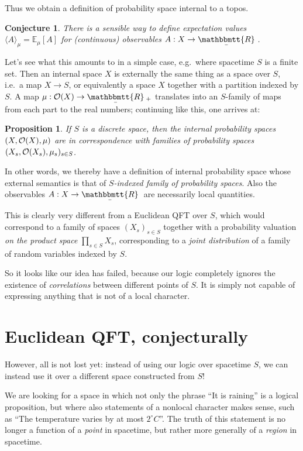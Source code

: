 \documentclass[11pt, oneside, article]{memoir}
\theoremstyle{plain}
\newtheorem{proposition}[theorem]{Proposition}
\newtheorem{conjecture}[theorem]{Conjecture}
\theoremstyle{definition}
\theoremstyle{remark}
\newcommand{\ubar}[1]{\underaccent{\bar}{#1}}
\newcommand{\internal}[1]{\raisebox{-.03ex}{$\mathbbmtt{#1}$}}
\newcommand{\hs}{\hspace{1.1pt}}
\newcommand{\tRR}{\internal{R}\hs}
\newcommand{\tLR}{\ubar{\tRR}\hs}
\begin{document}
Thus we obtain a definition of probability space internal to a topos.

\begin{conjecture}
There is a sensible way to define expectation values $\langle A \rangle_\mu = \mathbb{E}_\mu[A]$ for (continuous) observables $A : X \to \tLR$.
\end{conjecture}

Let's see what this amounts to in a simple case, e.g.~where spacetime $S$ is a finite set. Then an internal space $X$ is externally the same thing as a space over $S$, i.e.~a map $X\to S$, or equivalently a space $X$ together with a partition indexed by $S$. A map $\mu : \Open{X} \to \tLR_+$ translates into an $S$-family of maps from each part to the real numbers; continuing like this, one arrives at:

\begin{proposition}
If $S$ is a discrete space, then the internal probability spaces $(X,\mathcal{O}(X),\mu)$ are in correspondence with families of probability spaces $(X_s,\mathcal{O}(X_s),\mu_s)_{s\in S}$.
\end{proposition}

In other words, we thereby have a definition of internal probability space whose external semantics is that of \emph{$S$-indexed family of probability spaces}. Also the observables $A : X \to \tLR$ are necessarily local quantities.

This is clearly very different from a Euclidean QFT over $S$, which would correspond to a family of spaces $(X_s)_{s\in S}$ together with a probability valuation \emph{on the product space} $\prod_{s\in S} X_s$, corresponding to a \emph{joint distribution} of a family of random variables indexed by $S$.

So it looks like our idea has failed, because our logic completely ignores the existence of \emph{correlations} between different points of $S$. It is simply not capable of expressing anything that is not of a local character.

\chapter{Euclidean QFT, conjecturally}

However, all is not lost yet: instead of using our logic over spacetime $S$, we can instead use it over a different space constructed from $S$!

We are looking for a space in which not only the phrase ``It is raining'' is a logical proposition, but where also statements of a nonlocal character makes sense, such as ``The temperature varies by at most $2^\circ C$''. The truth of this statement is no longer a function of a \emph{point} in spacetime, but rather more generally of a \emph{region} in spacetime.
\end{document}
